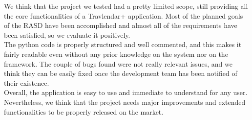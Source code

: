 We think that the project we tested had a pretty limited scope, still providing all the core functionalities of a Travlendar+ application. Most of the planned goals of the RASD have been accomplished and almost all of the requirements have been satisfied, so we evaluate it positively. \\
The python code is properly structured and well commented, and this makes it fairly readable even without any prior knowledge on the system nor on the framework. The couple of bugs found were not really relevant issues, and we think they can be easily fixed once the development team has been notified of their existence. \\
Overall, the application is easy to use and immediate to understand for any user. Nevertheless, we think that the project needs major improvements and extended functionalities to be properly released on the market.